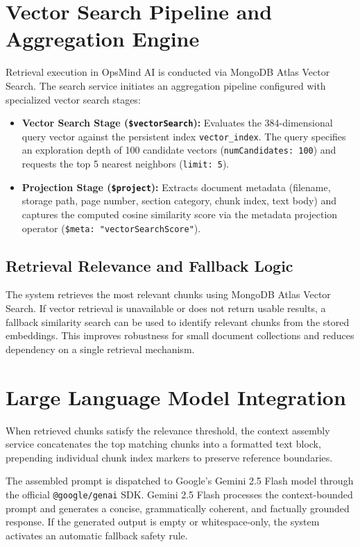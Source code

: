 \section{Vector Search Pipeline and Aggregation Engine}
\label{sec:impl_vector_search}

Retrieval execution in OpsMind AI is conducted via MongoDB Atlas Vector Search. The search service initiates an aggregation pipeline configured with specialized vector search stages:

\begin{itemize}
    \item \textbf{Vector Search Stage (\texttt{\$vectorSearch}):} Evaluates the 384-dimensional query vector against the persistent index \texttt{vector\_index}. The query specifies an exploration depth of 100 candidate vectors (\texttt{numCandidates: 100}) and requests the top 5 nearest neighbors (\texttt{limit: 5}).
    \item \textbf{Projection Stage (\texttt{\$project}):} Extracts document metadata (filename, storage path, page number, section category, chunk index, text body) and captures the computed cosine similarity score via the metadata projection operator (\texttt{\$meta: "vectorSearchScore"}).
\end{itemize}

\subsection{Retrieval Relevance and Fallback Logic}
\label{sec:impl_fallback_logic}
The system retrieves the most relevant chunks using MongoDB Atlas Vector Search. If vector retrieval is unavailable or does not return usable results, a fallback similarity search can be used to identify relevant chunks from the stored embeddings. This improves robustness for small document collections and reduces dependency on a single retrieval mechanism.

\section{Large Language Model Integration}
\label{sec:impl_llm_integration}

When retrieved chunks satisfy the relevance threshold, the context assembly service concatenates the top matching chunks into a formatted text block, prepending individual chunk index markers to preserve reference boundaries.

The assembled prompt is dispatched to Google's Gemini 2.5 Flash model through the official \texttt{@google/genai} SDK. Gemini 2.5 Flash processes the context-bounded prompt and generates a concise, grammatically coherent, and factually grounded response. If the generated output is empty or whitespace-only, the system activates an automatic fallback safety rule.


